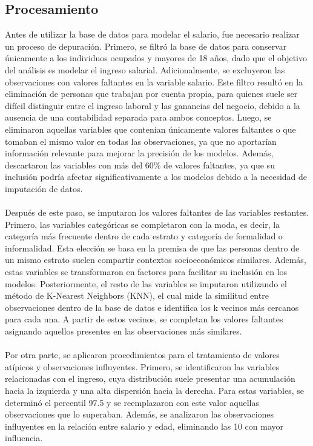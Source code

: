 \documentclass[article,11 pt]{article}
\begin{document}
\subsection{Procesamiento}
 Antes de utilizar la base de datos para modelar el salario, fue necesario realizar un proceso de depuración. Primero, se filtró la base de datos para conservar únicamente a los individuos ocupados y mayores de 18 años, dado que el objetivo del análisis es modelar el ingreso salarial. Adicionalmente, se excluyeron las observaciones con valores faltantes en la variable salario. Este filtro resultó en la eliminación de personas que trabajan por cuenta propia, para quienes suele ser difícil distinguir entre el ingreso laboral y las ganancias del negocio, debido a la ausencia de una contabilidad separada para ambos conceptos. Luego, se eliminaron aquellas variables que contenían únicamente valores faltantes o que tomaban el mismo valor en todas las observaciones, ya que no aportarían información relevante para mejorar la precisión de los modelos. Además, descartaron las variables con más del 60\% de valores faltantes, ya que su inclusión podría afectar significativamente a los modelos debido a la necesidad de imputación de datos.  
\\
\\
Después de este paso, se imputaron los valores faltantes de las variables restantes. Primero, las variables categóricas se completaron con la moda, es decir, la categoría más frecuente dentro de cada estrato y categoría de formalidad o informalidad. Esta elección se basa en la premisa de que las personas dentro de un mismo estrato suelen compartir contextos socioeconómicos similares. Además, estas variables se transformaron en factores para facilitar su inclusión en los modelos. Posteriormente, el resto de las variables se imputaron utilizando el método de K-Nearest Neighbors (KNN), el cual mide la similitud entre observaciones dentro de la base de datos e identifica los k vecinos más cercanos para cada una. A partir de estos vecinos, se completan los valores faltantes asignando aquellos presentes en las observaciones más similares.
\\
\\
Por otra parte, se aplicaron procedimientos para el tratamiento de valores atípicos y observaciones influyentes. Primero, se identificaron las variables relacionadas con el ingreso, cuya distribución suele presentar una acumulación hacia la izquierda y una alta dispersión hacia la derecha. Para estas variables, se determinó el percentil 97.5 y se reemplazaron con este valor aquellas observaciones que lo superaban. Además, se analizaron las observaciones influyentes en la relación entre salario y edad, eliminando las 10 con mayor influencia.
 
\end{document}
